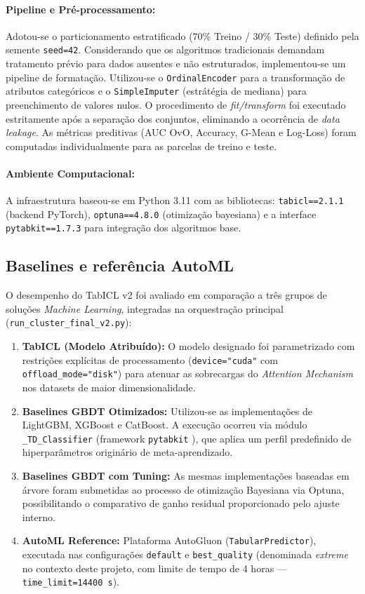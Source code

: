 \documentclass[12pt,a4paper]{article}
\begin{document}
\paragraph{Pipeline e Pré-processamento:} Adotou-se o particionamento estratificado (70\% Treino / 30\% Teste) definido pela semente \texttt{seed=42}. Considerando que os algoritmos tradicionais demandam tratamento prévio para dados ausentes e não estruturados, implementou-se um pipeline de formatação. Utilizou-se o \texttt{OrdinalEncoder} para a transformação de atributos categóricos e o \texttt{SimpleImputer} (estrátégia de mediana) para preenchimento de valores nulos. O procedimento de \textit{fit/transform} foi executado estritamente após a separação dos conjuntos, eliminando a ocorrência de \textit{data leakage}. As métricas preditivas (AUC OvO, Accuracy, G-Mean e Log-Loss) foram computadas individualmente para as parcelas de treino e teste.

\paragraph{Ambiente Computacional:} A infraestrutura baseou-se em Python 3.11 com as bibliotecas: \texttt{tabicl==2.1.1} (backend PyTorch), \texttt{optuna==4.8.0} (otimização bayesiana) e a interface \texttt{pytabkit==1.7.3} para integração dos algoritmos base.

\subsection{Baselines e referência AutoML}
O desempenho do TabICL v2 foi avaliado em comparação a três grupos de soluções \textit{Machine Learning}, integradas na orquestração principal (\texttt{run\_cluster\_final\_v2.py}):
\begin{enumerate}
    \item \textbf{TabICL (Modelo Atribuído):} O modelo designado foi parametrizado com restrições explícitas de processamento (\texttt{device="cuda"} com \texttt{offload\_mode="disk"}) para atenuar as sobrecargas do \textit{Attention Mechanism} nos datasets de maior dimensionalidade.
    \item \textbf{Baselines GBDT Otimizados:} Utilizou-se as implementações de LightGBM, XGBoost e CatBoost. A execução ocorreu via módulo \texttt{\_TD\_Classifier} (framework \texttt{pytabkit} \cite{holzmuller2024better}), que aplica um perfil predefinido de hiperparâmetros originário de meta-aprendizado.
    \item \textbf{Baselines GBDT com Tuning:} As mesmas implementações baseadas em árvore foram submetidas ao processo de otimização Bayesiana via Optuna, possibilitando o comparativo de ganho residual proporcionado pelo ajuste interno.
    \item \textbf{AutoML Reference:} Plataforma AutoGluon (\texttt{TabularPredictor}), executada nas configurações \texttt{default} e \texttt{best\_quality} (denominada \textit{extreme} no contexto deste projeto, com limite de tempo de 4 horas — \texttt{time\_limit=14400~s}).
\end{enumerate}
\end{document}
